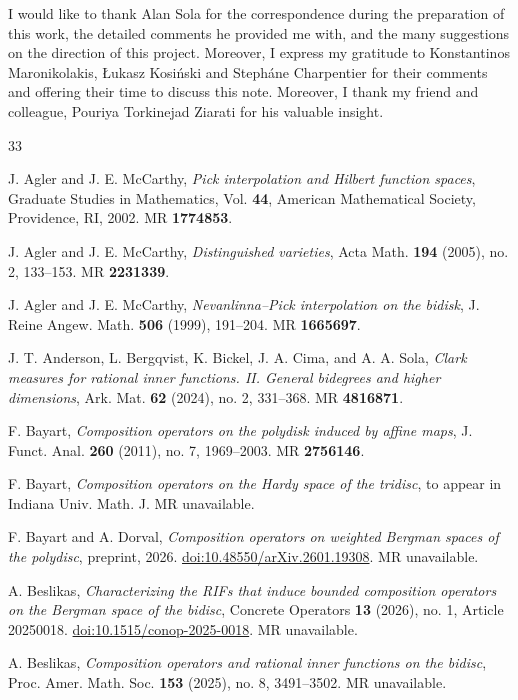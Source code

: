 \documentclass[12pt]{amsart}
\numberwithin{equation}{section}
\begin{document}
I would like to thank Alan Sola for the correspondence during the preparation of this work, the detailed comments he provided me with, and the many suggestions on the direction of this project. Moreover, I express my gratitude to Konstantinos Maronikolakis, \L{}ukasz Kosi\'nski and Steph\'ane Charpentier for their comments and offering their time to discuss this note. Moreover, I thank my friend and colleague, Pouriya Torkinejad Ziarati for his valuable insight. 
\begin{thebibliography}{33}

J. Agler and J. E. McCarthy,
\textit{Pick interpolation and Hilbert function spaces},
Graduate Studies in Mathematics, Vol. \textbf{44},
American Mathematical Society, Providence, RI, 2002.
MR \textbf{1774853}.

J. Agler and J. E. McCarthy,
\textit{Distinguished varieties},
Acta Math. \textbf{194} (2005), no. 2, 133--153.
MR \textbf{2231339}.

J. Agler and J. E. McCarthy,
\textit{Nevanlinna--Pick interpolation on the bidisk},
J. Reine Angew. Math. \textbf{506} (1999), 191--204.
MR \textbf{1665697}.

J. T. Anderson, L. Bergqvist, K. Bickel, J. A. Cima, and A. A. Sola,
\textit{Clark measures for rational inner functions. II. General bidegrees and higher dimensions},
Ark. Mat. \textbf{62} (2024), no. 2, 331--368.
MR \textbf{4816871}.

F. Bayart,
\textit{Composition operators on the polydisk induced by affine maps},
J. Funct. Anal. \textbf{260} (2011), no. 7, 1969--2003.
MR \textbf{2756146}.

F. Bayart,
\textit{Composition operators on the Hardy space of the tridisc},
to appear in Indiana Univ. Math. J.
MR unavailable.

F. Bayart and A. Dorval,
\textit{Composition operators on weighted Bergman spaces of the polydisc},
preprint, 2026.
\href{https://doi.org/10.48550/arXiv.2601.19308}{doi:10.48550/arXiv.2601.19308}.
MR unavailable.

A. Beslikas,
\textit{Characterizing the RIFs that induce bounded composition operators on the Bergman space of the bidisc},
Concrete Operators \textbf{13} (2026), no. 1, Article 20250018.
\href{https://doi.org/10.1515/conop-2025-0018}{doi:10.1515/conop-2025-0018}.
MR unavailable.

A. Beslikas,
\textit{Composition operators and rational inner functions on the bidisc},
Proc. Amer. Math. Soc. \textbf{153} (2025), no. 8, 3491--3502.
MR unavailable.


\end{thebibliography}
\end{document}
